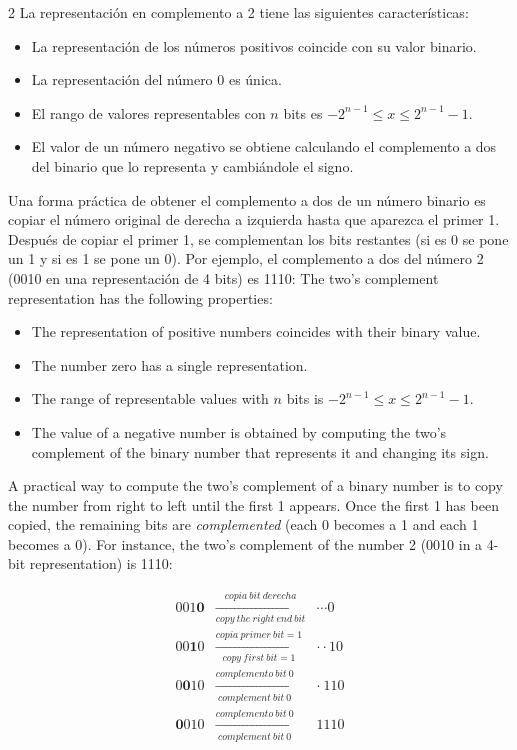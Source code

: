 \begin{paracol}{2}
La representación en complemento a 2 tiene las siguientes características:
\begin{itemize}
\item La representación de los números positivos coincide con su valor binario.
\item La representación del número 0 es única.
\item El rango de valores representables con $n$ bits es $-2^{n-1} \le x \le  2^{n-1}-1$.
\item El valor de un número negativo se obtiene calculando el complemento a dos del binario que lo representa y cambiándole el signo.
\end{itemize}

Una forma práctica de obtener el complemento a dos de un número binario es copiar el número original de derecha a izquierda hasta que aparezca el primer 1. Después de copiar el primer 1, se complementan los bits restantes (si es 0 se pone un 1 y si es 1 se pone un 0). Por ejemplo, el complemento a dos del número 2 (0010 en una representación de 4 bits) es 1110:
\switchcolumn
The two's complement representation has the following properties:
\begin{itemize}
    \item The representation of positive numbers coincides with their binary value.
    \item The number zero has a single representation.
    \item The range of representable values with $n$ bits is $-2^{n-1} \le x \le  2^{n-1}-1$.
    \item The value of a negative number is obtained by computing the two's complement of the binary number that represents it and changing its sign.
\end{itemize}
A practical way to compute the two's complement of a binary number is to copy the number from right to left until the first 1 appears. Once the first 1 has been copied, the remaining bits are \emph{complemented} (each 0 becomes a 1 and each 1 becomes a 0). For instance, the two's complement of the number 2 (0010 in a 4-bit representation) is 1110:
\end{paracol}

\begin{eqnarray*}
001\mathbf{0} & \xrightarrow[copy\ the\ right\ end\ bit]{copia\  bit\ derecha }& \cdots 0 \\
00\mathbf{1}0 & \xrightarrow[copy\ first\ bit=1]{copia\ primer\ bit = 1}& \cdot \cdot 10\\
0 \mathbf{0}10& \xrightarrow[complement\ bit\ 0]{complemento\ bit\  0} &\cdot  \ 110\\
 \mathbf{0}010& \xrightarrow[complement\ bit\ 0]{complemento\ bit\ 0} &1110
\end{eqnarray*}

